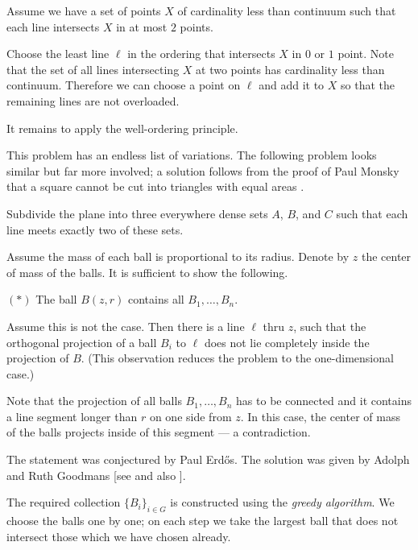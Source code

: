 Assume we have a set of points $X$ of cardinality less than continuum such that each line intersects $X$ in at most $2$ points.

Choose the least line $\ell$ in the ordering that intersects $X$ 
in $0$ or $1$ point.
Note that the set of all lines intersecting $X$ at two points has cardinality less than continuum.
Therefore we can choose a point on $\ell$ and add it to $X$ so that the remaining lines are not overloaded.

It remains to apply the well-ordering principle.
\qeds

This problem has an endless list of variations.
The following problem looks similar but far more involved;
a solution follows from the proof of Paul Monsky that a square cannot be cut into triangles with equal areas \cite{monsky}.

\begin{pr}
Subdivide the plane into three everywhere dense sets $A$, $B$, and $C$ such that each line meets exactly two of these sets.
\end{pr}


Assume the mass of each ball is proportional to its radius.
Denote by $z$  the center of mass of the balls.
It is sufficient to show the following.
\begin{cl}{$({*})$}
The ball $B(z,r)$ contains all $B_1,\dots,B_n$.
\end{cl}

Assume this is not the case.
Then there is a line $\ell$ thru $z$, 
such that the orthogonal projection of a ball $B_i$ to $\ell$ 
does not lie completely inside the projection of $B$.
(This observation reduces the problem to the one-dimensional case.)

Note that the projection of all balls $B_1,\dots,B_n$ has to be connected and it contains a line segment longer than $r$ on one side from $z$. 
In this case, the center of mass of the balls projects inside of this segment --- a contradiction.
\qeds

The statement was conjectured by Paul Erdős.
The solution was given by Adolph and Ruth Goodmans
[see  and also ].


The required collection $\{B_i\}_{i\in G}$ is constructed using the \emph{greedy algorithm}. 
We choose the balls one by one;
on each step we take the largest ball that does not intersect those which we have chosen already.

